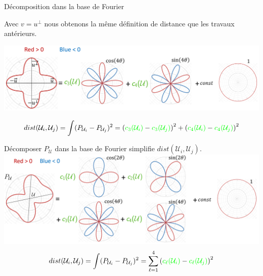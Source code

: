 \begin{frame}{Décomposition dans la base de Fourier}
    \centering
    \begin{overprint}
     \centering
    Avec $v = u^{\perp}$ nous obtenons la même définition de distance que les travaux antérieurs.
    
    \includegraphics[width=0.95\linewidth]{img_spm_ff/ortho_decomposition_with_circle.PNG}
    
    $$ dist(\mathcal{U}_i, \mathcal{U}_j) =  \int (P_{\mathcal{U}_i} - P_{\mathcal{U}_j})^2 =  \left({\color{green}c_3(\mathcal{U}_i)} - {\color{green}c_3(\mathcal{U}_j)} \right)^2 
    + \left({\color{green}c_4(\mathcal{U}_i)} - {\color{green}c_4(\mathcal{U}_j)} \right)^2$$
     \centering
    
    Décomposer $P_\mathcal{U}$ dans la base de Fourier simplifie $dist(\mathcal{U}_i, \mathcal{U}_j)$. \\
    \includegraphics[width=0.95\linewidth]{img_spm_ff/polynome_decomposition_with_circle.PNG}
    $$ dist(\mathcal{U}_i, \mathcal{U}_j) =  \int (P_{\mathcal{U}_i} - P_{\mathcal{U}_j})^2 = \sum_{\ell=1}^4 \left({\color{green}c_\ell(\mathcal{U}_i)} - {\color{green}c_\ell(\mathcal{U}_j)} \right)^2$$
    \end{overprint}
    
\end{frame} 

